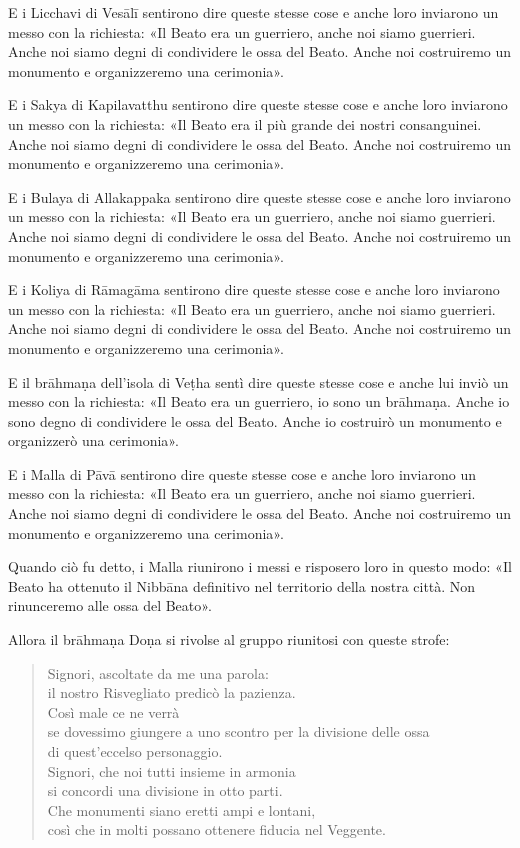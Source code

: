 E i Licchavi di Vesālī sentirono dire queste stesse cose e anche loro inviarono
un messo con la richiesta: «Il Beato era un guerriero, anche noi siamo
guerrieri. Anche noi siamo degni di condividere le ossa del Beato. Anche noi
costruiremo un monumento e organizzeremo una cerimonia».

E i Sakya di Kapilavatthu sentirono dire queste stesse cose e anche loro
inviarono un messo con la richiesta: «Il Beato era il più grande dei nostri
consanguinei. Anche noi siamo degni di condividere le ossa del Beato. Anche noi
costruiremo un monumento e organizzeremo una cerimonia».

E i Bulaya di Allakappaka sentirono dire queste stesse cose e anche loro
inviarono un messo con la richiesta: «Il Beato era un guerriero, anche noi siamo
guerrieri. Anche noi siamo degni di condividere le ossa del Beato. Anche noi
costruiremo un monumento e organizzeremo una cerimonia».

E i Koliya di Rāmagāma sentirono dire queste stesse cose e anche loro inviarono
un messo con la richiesta: «Il Beato era un guerriero, anche noi siamo
guerrieri. Anche noi siamo degni di condividere le ossa del Beato. Anche noi
costruiremo un monumento e organizzeremo una cerimonia».

E il brāhmaṇa dell’isola di Veṭha sentì dire queste stesse cose e anche lui
inviò un messo con la richiesta: «Il Beato era un guerriero, io sono un
brāhmaṇa. Anche io sono degno di condividere le ossa del Beato. Anche io
costruirò un monumento e organizzerò una cerimonia».

E i Malla di Pāvā sentirono dire queste stesse cose e anche loro inviarono un
messo con la richiesta: «Il Beato era un guerriero, anche noi siamo guerrieri.
Anche noi siamo degni di condividere le ossa del Beato. Anche noi costruiremo un
monumento e organizzeremo una cerimonia».

Quando ciò fu detto, i Malla riunirono i messi e risposero loro in questo modo:
«Il Beato ha ottenuto il Nibbāna definitivo nel territorio della nostra città.
Non rinunceremo alle ossa del Beato».

Allora il brāhmaṇa Doṇa si rivolse al gruppo riunitosi con queste strofe:

\begin{quote}
Signori, ascoltate da me una parola: \\
il nostro Risvegliato predicò la pazienza. \\
Così male ce ne verrà \\
se dovessimo giungere a uno scontro per la divisione delle ossa \\
di quest’eccelso personaggio. \\
Signori, che noi tutti insieme in armonia \\
si concordi una divisione in otto parti. \\
Che monumenti siano eretti ampi e lontani, \\
così che in molti possano ottenere fiducia nel Veggente.
\end{quote}

